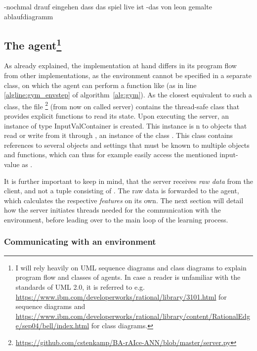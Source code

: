 -nochmal drauf eingehen dass das spiel live ist
-das von leon gemalte ablaufdiagramm


\subsection{The agent\footnote{I will rely heavily on UML sequence diagrams and class diagrams to explain program flow and classes of agents. In case a reader is unfamiliar with the standards of UML 2.0, it is referred to e.g. \url{https://www.ibm.com/developerworks/rational/library/3101.html} for sequence diagrams and \url{https://www.ibm.com/developerworks/rational/library/content/RationalEdge/sep04/bell/index.html} for class diagrams.}}

As already explained, the implementation at hand differs in its program flow from other implementations, as the environment cannot be specified in a separate class, on which the agent can perform a function like  (as in line \ref{algline:gym_envstep} of algorithm~\ref{alg:gym}). As the closest equivalent to such a class, the file  \footnote{\url{https://github.com/cstenkamp/BA-rAIce-ANN/blob/master/server.py}} (from now on called server) contains the thread-safe class  that provides explicit functions to read its state. Upon executing the server, an instance  of type InputValContainer is created. This instance is n to objects that read or write from it through , an instance of the class . This class contains references to several objects and settings that must be known to multiple objects and functions, which can thus for example easily access the mentioned input-value as .

It is further important to keep in mind, that the server receives \textit{raw data} from the client, and not a tuple consisting of . The raw data is forwarded to the agent, which calculates the respective \textit{features} on its own. The next section will detail how the server initiates threads needed for the communication with the environment, before leading over to the main loop of the learning process.

\subsubsection{Communicating with an environment}

